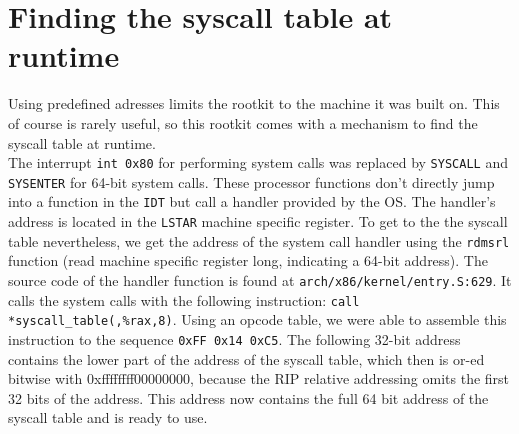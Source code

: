 \section{Finding the syscall table at runtime}
Using predefined adresses limits the rootkit to the machine it was 
built on. This of course is rarely useful, so this rootkit comes with a 
mechanism to find the syscall table at runtime. \\
The interrupt \texttt{int 0x80} for performing system calls was replaced by 
\texttt{SYSCALL} and \texttt{SYSENTER} for 64-bit system calls. These processor 
functions don't directly jump into a function in the \texttt{IDT} but call a 
handler provided by the OS. The handler's address is located in the 
\texttt{LSTAR} machine specific register. To get to the the syscall table 
nevertheless, we get the address of the system call handler using the 
\texttt{rdmsrl} function (read 
machine specific register long, indicating a 64-bit address). The source code 
of the handler function is found at \texttt{arch/x86/kernel/entry.S:629}. It 
calls the system calls with the following instruction: 
\verb+call *syscall_table(,%rax,8)+. Using an opcode table, we were able to 
assemble this instruction to the sequence \texttt{0xFF 0x14 0xC5}. The following 
32-bit address contains the lower part of the address of the syscall table,
which then is or-ed bitwise with 0xffffffff00000000, because the RIP 
relative addressing omits the first 32 bits of the address. This address now 
contains the full 64 bit address of the syscall table and is ready to use.
